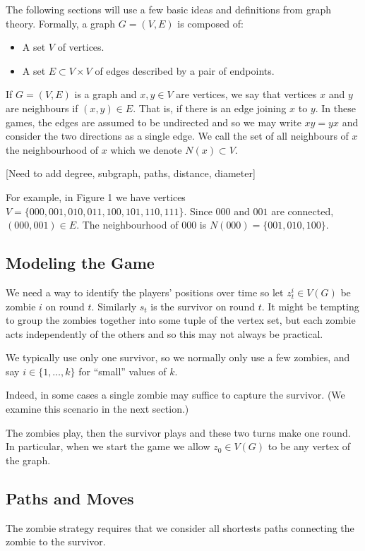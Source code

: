 
The following sections will use a few basic ideas and definitions from graph theory.
Formally, a graph $G = (V, E)$ is composed of:

\begin{itemize}
\item A set $V$ of vertices.
\item A set $E \subset V \times V$ of edges described by a pair of endpoints.
\end{itemize}

If $G = (V,E)$ is a graph and $x,y \in V$ are vertices, we say that vertices $x$ and $y$ are neighbours if $(x,y) \in E$.
That is, if there is an edge joining $x$ to $y$.
In these games, the edges are assumed to be undirected and so we may write $xy = yx$
and consider the two directions as a single edge.
We call the set of all neighbours of $x$ the neighbourhood of $x$ which we denote $N(x) \subset V$.

[Need to add degree, subgraph, paths,  distance, diameter]

For example, in Figure 1 we have vertices $V = \{ 000, 001, 010, 011, 100, 101, 110, 111 \}$.
Since $000$ and $001$ are connected, $(000, 001) \in E$.
The neighbourhood of $000$ is $N(000) = \{ 001, 010, 100 \}$.

\subsection{Modeling the Game}

We need a way to identify the players' positions over time so let
$z_t^i \in V(G)$ be zombie $i$ on round $t$. Similarly $s_t$ is the
survivor on round $t$. It might be tempting to group the zombies together
into some tuple of the vertex set, but each zombie acts independently of
the others and so this may not always be practical.

We typically use only one survivor, so we normally only use a few zombies, and
say $i \in \{1, \dots, k\}$ for ``small'' values of $k$.

Indeed, in some cases a single zombie may suffice
to capture the survivor. (We examine this scenario in the next section.)

The zombies play, then the survivor plays and these two turns make one round.
In particular, when we start the game we allow $z_0 \in V(G)$ to be
 any vertex of the graph.

\subsection{Paths and Moves}
The zombie strategy requires that we consider all shortests paths connecting
the zombie to the survivor.

